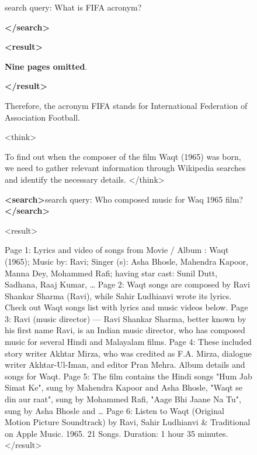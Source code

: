 \documentclass{article}
\begin{document}
\begin{figure}[h]
\begin{minipage}[t]{0.48\linewidth}
\begin{tcolorbox}
    search query: What is FIFA acronym?
    
    \textcolor{mydarkred}{\textbf{</search>}}
    
    \textbf{<result>}
    
    \textbf{Nine pages omitted}.

    \textbf{</result>}

    Therefore, the acronym FIFA stands for International Federation of 
    Association Football.
    \end{tcolorbox}
\end{minipage}

\end{figure}



\begin{figure}[h]
\centering
 
\begin{tcolorbox}[
    colback=gray!5!white, 
    colframe=brown!75!brown, 
    title=Case-3 (Tool-Star RL Dataset): when the composer of the film Waqt (1965) was born?, 
    boxrule=0.3mm, 
    width=\linewidth,  
    arc=2mm, 
    auto outer arc=true
] 

<think> 

To find out when the composer of the film Waqt (1965) was born, we need to gather relevant information through Wikipedia searches and identify the necessary details. </think>


\textcolor{mydarkred}{\textbf{<search>}}search query: Who composed music for Waq 1965 film? \textcolor{mydarkred}{\textbf{</search>}}

<result>

Page 1: Lyrics and video of songs from Movie / Album : Waqt (1965); Music by: Ravi; Singer (s): Asha Bhosle, Mahendra Kapoor, Manna Dey, Mohammed Rafi; having star cast: Sunil Dutt, Sadhana, Raaj Kumar, …
Page 2: Waqt songs are composed by Ravi Shankar Sharma (Ravi), while Sahir Ludhianvi wrote its lyrics. Check out Waqt songs list with lyrics and music videos below.
Page 3: Ravi (music director) — Ravi Shankar Sharma, better known by his first name Ravi, is an Indian music director, who has composed music for several Hindi and Malayalam films.
Page 4: These included story writer Akhtar Mirza, who was credited as F.A. Mirza, dialogue writer Akhtar-Ul-Iman, and editor Pran Mehra. Album details and songs for Waqt.
Page 5: The film contains the Hindi songs "Hum Jab Simat Ke", sung by Mahendra Kapoor and Asha Bhosle, "Waqt se din aur raat", sung by Mohammed Rafi, "Aage Bhi Jaane Na Tu", sung by Asha Bhosle and …
Page 6: Listen to Waqt (Original Motion Picture Soundtrack) by Ravi, Sahir Ludhianvi \& Traditional on Apple Music. 1965. 21 Songs. Duration: 1 hour 35 minutes. </result> 


\end{tcolorbox}
\end{figure}
\end{document}
